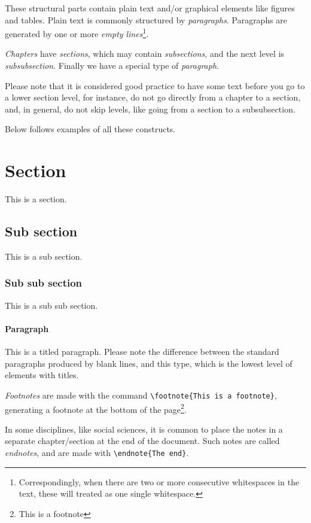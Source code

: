 These structural parts contain
plain text and/or graphical elements like figures and tables. 
Plain text is commonly structured by {\em paragraphs}. Paragraphs are generated by one or more {\em empty lines}\footnote{Correspondingly, when there are two or more       consecutive          whitespaces in the text, these will treated as one single whitespace.}. 

{\em Chapters} have {\em sections}, which may contain {\em subsections}, and the next level is {\em subsubsection}.
Finally we have a special type of {\em paragraph}.

Please note that it is considered good practice to have some text before you go to a lower section level, for instance, do not go directly from a chapter to a section, and, in general, do not skip levels, like going from a section to a subsubsection.

Below follows examples of all these constructs.


\section{Section} 
This is a section. \lipsum[10-12]
\subsection{Sub section} 
This is a sub section. \lipsum[13-14]
\subsubsection{Sub sub section} 
This is a sub sub section. \lipsum[15-16]
\paragraph{Paragraph} 
This is a titled paragraph.
Please note the difference between the standard paragraphs produced by blank lines, and this type, which is the lowest level of elements with titles.

{\em Footnotes} are made with the command \verb|\footnote{This is a footnote}|, generating a footnote at the bottom of the page\footnote{This is a footnote}.

In some disciplines, like social sciences, it is common to place the notes in a separate chapter/section at the end of the document. Such notes are called {\em endnotes}, and are made with \verb|\endnote{The end}|. 

